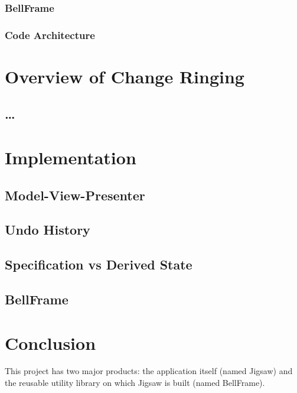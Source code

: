 \documentclass[12pt]{article}
\begin{document}
\subsubsection{BellFrame}

\subsubsection{Code Architecture}



\pagebreak

\section{Overview of Change Ringing}

\subsection{\ldots}



\section{Implementation}

\subsection{Model-View-Presenter}

\subsection{Undo History}

\subsection{Specification vs Derived State}

\subsection{BellFrame}



\pagebreak

\section{Conclusion}

This project has two major products: the application itself (named Jigsaw) and the reusable utility
library on which Jigsaw is built (named BellFrame).
\end{document}
